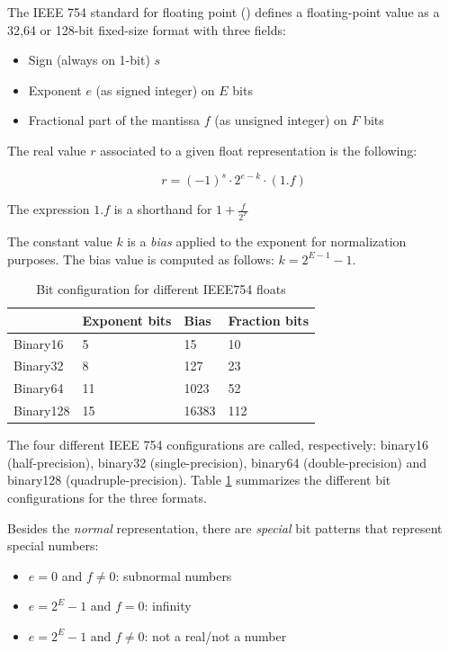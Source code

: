 The IEEE 754 standard for floating point (\cite{893287}) defines a floating-point value as a 32,64 or 128-bit fixed-size format with three fields:
\begin{itemize}
    \item Sign (always on 1-bit) $s$
    \item Exponent $e$ (as signed integer) on $E$ bits
    \item Fractional part of the mantissa $f$ (as unsigned integer) on $F$ bits
\end{itemize}

The real value $r$ associated to a given float representation is the following:

\begin{equation}\label{eqn:float2real}
    r = (-1)^s \cdot 2^{e-k} \cdot (1.f)
\end{equation}

The expression $1.f$ is a shorthand for $1 + \frac{f}{2^F}$

The constant value $k$ is a \textit{bias} applied to the exponent for normalization purposes. The bias value is computed as follows: $k = 2^{E-1} - 1$.



\begin{table}[b]
\centering
\caption{Bit configuration for different IEEE754 floats}
\label{tab:ieee754configs}
\begin{tabular}{l|lll}
\hline
          & Exponent bits & Bias  & Fraction bits \\ \hline
Binary16 &  5             & 15    & 10            \\ \hline
Binary32  & 8             & 127   & 23            \\ \hline
Binary64  & 11            & 1023  & 52            \\ \hline
Binary128 & 15            & 16383 & 112           \\ \hline
\end{tabular}
\end{table}

The four different IEEE 754 configurations are called, respectively: binary16 (half-precision), binary32 (single-precision), binary64 (double-precision) and binary128 (quadruple-precision). Table \ref{tab:ieee754configs} summarizes the different bit configurations for the three formats.

Besides the \textit{normal} representation, there are \textit{special} bit patterns that represent special numbers:
\begin{itemize}
    \item $e = 0$ and $f \neq 0$: subnormal numbers
    \item $e = 2^{E} - 1$ and $f = 0$: infinity
    \item $e = 2^{E} - 1$ and $f \neq 0$: not a real/not a number
\end{itemize}


